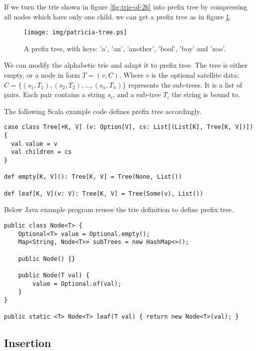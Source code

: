 \documentclass{article}
\begin{document}
If we turn the trie shown in figure \ref{fig:trie-of-26} into prefix tree
by compressing all nodes which have only one child. we can get
a prefix tree as in figure \ref{fig:patricia-tree}.

\begin{figure}[htbp]
  \centering
  \texttt{[image: img/patricia-tree.ps]}
  \caption{A prefix tree, with keys: 'a', 'an', 'another', 'bool',
    'boy' and 'zoo'.}
  \label{fig:patricia-tree}
\end{figure}

We can modify the alphabetic trie and adapt it
to prefix tree. The tree is either empty, or a node in form $T = (v, C)$.
Where $v$ is the optional satellite data; $C = \{(s_1, T_1), (s_2, T_2), ..., (s_n, T_n)\}$ represents the sub-trees. It is a list of pairs. Each pair contains
a string $s_i$, and a sub-tree $T_i$ the string is bound to.

The following Scala example code defines prefix tree accordingly.

\lstset{language=Scala}
\begin{lstlisting}
case class Tree[+K, V] (v: Option[V], cs: List[(List[K], Tree[K, V])]) {
  val value = v
  val children = cs
}

def empty[K, V](): Tree[K, V] = Tree(None, List())

def leaf[K, V](v: V): Tree[K, V] = Tree(Some(v), List())
\end{lstlisting}

Below Java example program reuses the trie definition to define prefix tree.

\lstset{language=Java}
\begin{lstlisting}
public class Node<T> {
    Optional<T> value = Optional.empty();
    Map<String, Node<T>> subTrees = new HashMap<>();

    public Node() {}

    public Node(T val) {
        value = Optional.of(val);
    }
}

public static <T> Node<T> leaf(T val) { return new Node<T>(val); }
\end{lstlisting}

\subsection{Insertion}
\end{document}
